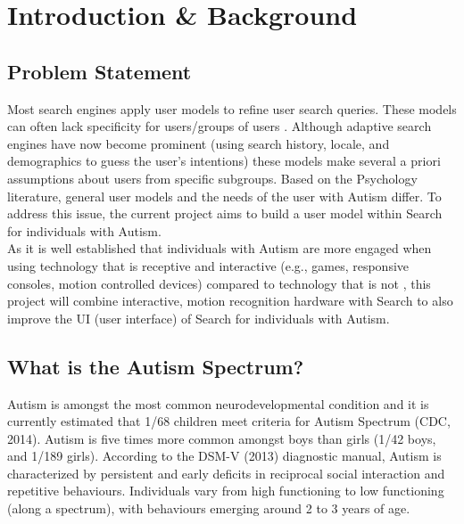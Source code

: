\documentclass[a4paper, 10pt]{article}
\begin{document}
\clearpage

\section{Introduction \& Background}
\subsection{Problem Statement} \label{prob}
Most search engines apply user models to refine user search queries. These models can often lack specificity for users/groups of users \cite{usermodel}. Although adaptive search engines have now become prominent (using search history, locale, and demographics to guess the user's intentions) these models make several a priori assumptions about users from specific subgroups. Based on the Psychology literature, general user models and the needs of the user with Autism differ. To address this issue, the current project aims to build a user model within Search for individuals with Autism.\\
As it is well established that individuals with Autism are more engaged when using technology that is receptive and interactive (e.g., games, responsive consoles, motion controlled devices) compared to technology that is not \cite{motioncontrollerforautism}, this project will combine interactive, motion recognition hardware with Search to also improve the UI (user interface) of Search for individuals with Autism.

\subsection{What is the Autism Spectrum?}
Autism is amongst the most common neurodevelopmental condition and it is currently estimated that 1/68 children meet criteria for Autism Spectrum (CDC, 2014). Autism is five times more common amongst boys than girls (1/42 boys, and 1/189 girls). According to the DSM-V (2013) diagnostic manual, Autism is characterized by persistent and early deficits in reciprocal social interaction and repetitive behaviours. Individuals vary from high functioning to low functioning (along a spectrum), with behaviours emerging around 2 to 3 years of age. 
\end{document}
